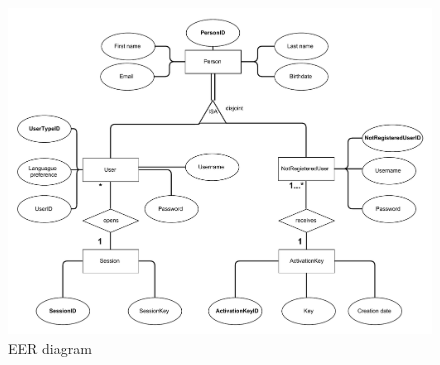 \begin{figure}[H]
	\centering
	\includegraphics[scale=0.5]{img/EERIT1.pdf}
	\caption{EER diagram}
	\label{fig:EER diagram}
\end{figure}